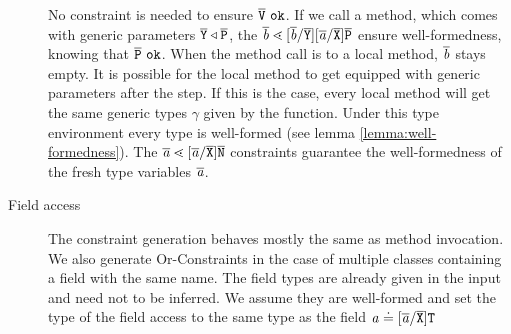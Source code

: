 \begin{description}
No constraint is needed to ensure $\ol{V}\ \texttt{ok}$.
If we call a method, which comes with generic parameters $\overline{\tt Y} \triangleleft \overline{\tt P}$,
the $\overline{\tt \mathit{ b }} \lessdot [\overline{\tt \mathit{ b }}/\overline{\tt Y}][\overline{\tt \mathit{ a }}/\overline{\tt X}]\overline{\tt P}$ ensure well-formedness, knowing that $\ol{P}\ \texttt{ok}$.
When the method call is to a local method, $\overline{\tt \mathit{ b }}$ stays empty.
It is possible for the local method to get equipped with generic parameters after the \unify{} step.
If this is the case, every local method will get the same generic types $\gamma$ given by the \unify{} function.
Under this type environment every type is well-formed (see lemma \ref{lemma:well-formedness}).
The $\overline{\tt \mathit{ a }} \lessdot [\overline{\mathit{ a }}/\overline{\tt X}]\overline{\tt N}$ constraints guarantee the well-formedness of the fresh type variables $\overline{\tt \mathit{ a }}$.

\item[Field access]
The constraint generation behaves mostly the same as method invocation.
We also generate Or-Constraints in the case of multiple classes containing a field with the same name.
The field types are already given in the input and need not to be inferred.
We assume they are well-formed and set the type of the field access to the same type as the field $\mathit{ a } \doteq
[\overline{\mathit{ a }}/\overline{\tt X}]\texttt{T}$


\end{description}
